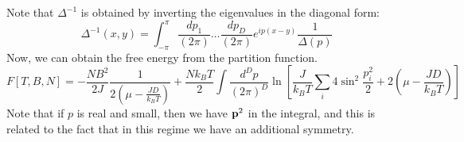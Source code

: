 Note that $\Delta^{-1}$ is obtained by inverting the eigenvalues in the diagonal form:
\begin{equation}
    \Delta^{-1}(x, y) = \int_{-\pi}^\pi \frac{dp_1}{(2\pi)} \ldots \frac{dp_D}{(2\pi)}e^{ip(x-y)}\frac{1}{\Delta(p)}
\end{equation}
Now, we can obtain the free energy from the partition function. 
\begin{equation}
    F[T, B, N] = -\frac{NB^2}{2J}\frac{1}{2\left(\mu - \frac{JD}{k_B T}\right)} + \frac{Nk_B T}{2}\int \frac{d^Dp}{(2\pi)^D}\ln \left[\frac{J}{k_B T}\sum_i 4\sin^2\frac{p_i^2}{2} + 2\left(\mu - \frac{JD}{k_B T}\right)\right]
\end{equation}
Note that if $p$ is real and small, then we have $\mathbf{p}^2$ in the integral, and this is related to the fact that in this regime we have an additional symmetry. 

